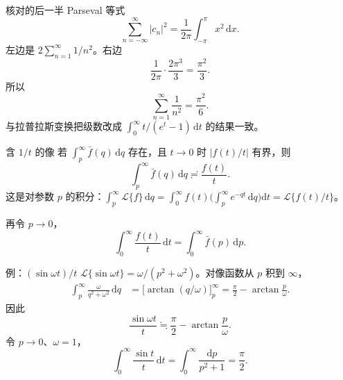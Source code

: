 \documentclass[fontset=windows, chinese, 10pt, xcolor=dvipsnames]{beamer}
\begin{document}
\begin{frame}{核对的后一半}
  Parseval 等式
  \begin{equation*}
    \sum_{n=-\infty}^{\infty}|c_n|^2
    =\frac{1}{2\pi}\int_{-\pi}^{\pi} x^2\,\mathrm{d}x.
  \end{equation*}
  左边是 $2\sum_{n=1}^{\infty} 1/n^2$。右边
  \begin{equation*}
    \frac{1}{2\pi}\cdot\frac{2\pi^3}{3}=\frac{\pi^2}{3}.
  \end{equation*}
  所以
  \begin{equation*}
    \sum_{n=1}^{\infty}\frac{1}{n^2}=\frac{\pi^2}{6}.
  \end{equation*}
  与拉普拉斯变换把级数改成 $\displaystyle\int_0^{\infty} t/(e^t-1)\,\mathrm{d}t$ 的结果一致。
\end{frame}

\begin{frame}{含 $1/t$ 的像}
  若 $\displaystyle\int_p^{\infty}\bar f(q)\,\mathrm{d}q$ 存在，且 $t\to 0$ 时 $|f(t)/t|$ 有界，则
  \begin{equation*}
    \int_p^{\infty}\bar f(q)\,\mathrm{d}q
    \risingdotseq\frac{f(t)}{t}.
  \end{equation*}
  这是对参数 $p$ 的积分：$\displaystyle\int_p^{\infty}\mathcal{L}\{f\}\,\mathrm{d}q
    =\int_0^{\infty} f(t)\bigl(\int_p^{\infty} e^{-qt}\,\mathrm{d}q\bigr)\mathrm{d}t
    =\mathcal{L}\{f(t)/t\}$。
  \vspace{0.3em}

  再令 $p\to 0$，
  \begin{equation*}
    \int_0^{\infty}\frac{f(t)}{t}\,\mathrm{d}t
    =\int_0^{\infty}\bar f(p)\,\mathrm{d}p.
  \end{equation*}
\end{frame}

\begin{frame}{例：$(\sin\omega t)/t$}
  $\mathcal{L}\{\sin\omega t\}=\omega/(p^2+\omega^2)$。对像函数从 $p$ 积到 $\infty$，
  \begin{align*}
    \int_p^{\infty}\frac{\omega}{q^2+\omega^2}\,\mathrm{d}q
    &=\bigl[\arctan(q/\omega)\bigr]_p^{\infty}
     =\frac{\pi}{2}-\arctan\frac{p}{\omega}.
  \end{align*}
  因此
  \begin{equation*}
    \frac{\sin\omega t}{t}
    \fallingdotseq\frac{\pi}{2}-\arctan\frac{p}{\omega}.
  \end{equation*}
  令 $p\to 0$、$\omega=1$，
  \begin{equation*}
    \int_0^{\infty}\frac{\sin t}{t}\,\mathrm{d}t
    =\int_0^{\infty}\frac{\mathrm{d}p}{p^2+1}
    =\frac{\pi}{2}.
  \end{equation*}
\end{frame}
\end{document}
